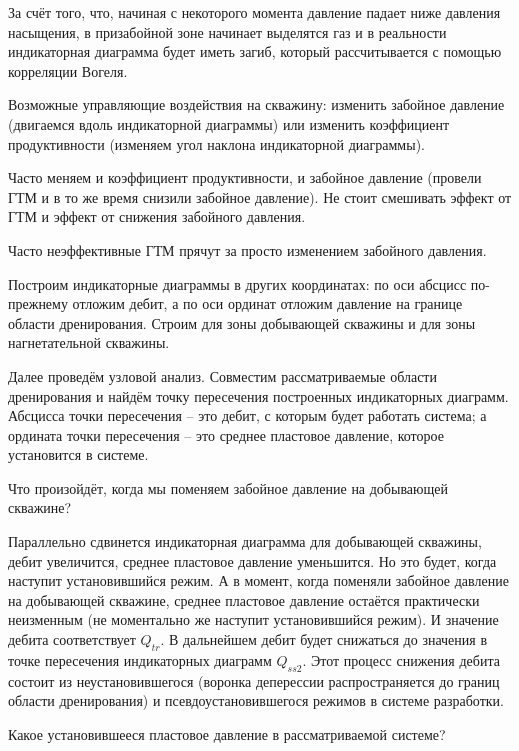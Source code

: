 \documentclass[main.tex]{subfiles}
\begin{document}
За счёт того, что, начиная с некоторого момента давление падает ниже давления насыщения, в призабойной зоне начинает выделятся газ и в реальности индикаторная диаграмма будет иметь загиб, который рассчитывается с помощью корреляции Вогеля.

Возможные управляющие воздействия на скважину: изменить забойное давление (двигаемся вдоль индикаторной диаграммы) или изменить коэффициент продуктивности (изменяем угол наклона индикаторной диаграммы).

Часто меняем и коэффициент продуктивности, и забойное давление (провели ГТМ и в то же время снизили забойное давление). Не стоит смешивать эффект от ГТМ и эффект от снижения забойного давления.

Часто неэффективные ГТМ прячут за просто изменением забойного давления.


Построим индикаторные диаграммы в других координатах: по оси абсцисс по-прежнему отложим дебит, а по оси ординат отложим давление на границе области дренирования. Строим для зоны добывающей скважины и для зоны нагнетательной скважины.

Далее проведём узловой анализ. Совместим рассматриваемые области дренирования и найдём точку пересечения построенных индикаторных диаграмм. Абсцисса точки пересечения -- это дебит, с которым будет работать система; а ордината точки пересечения -- это среднее пластовое давление, которое установится в системе.


Что произойдёт, когда мы поменяем забойное давление на добывающей скважине?

Параллельно сдвинется индикаторная диаграмма для добывающей скважины, дебит увеличится, среднее пластовое давление уменьшится. Но это будет, когда наступит установившийся режим. А в момент, когда поменяли забойное давление на добывающей скважине, среднее пластовое давление остаётся практически неизменным (не моментально же наступит установившийся режим). И значение дебита соответствует $Q_{tr}$. В дальнейшем дебит будет снижаться до значения в точке пересечения индикаторных диаграмм $Q_{ss2}$. Этот процесс снижения дебита состоит из неустановившегося (воронка деперессии распространяется до границ области дренирования) и псевдоустановившегося режимов в системе разработки.



Какое установившееся пластовое давление в рассматриваемой системе?
\end{document}
